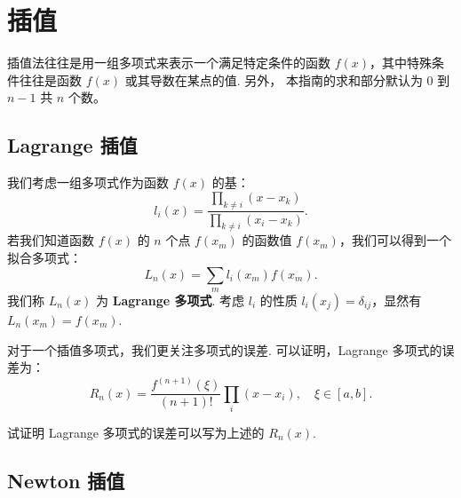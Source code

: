 \chapter{插值}
插值法往往是用一组多项式来表示一个满足特定条件的函数 $f(x)$，其中特殊条件往往是函数 $f(x)$ 或其导数在某点的值. 另外，{\color{red} 本指南的求和部分默认为 $0$ 到 $n-1$ 共 $n$ 个数。}

\section{Lagrange 插值}
我们考虑一组多项式作为函数 $f(x)$ 的基：
\[
    l_i(x) = \dfrac{\prod_{k\neq i}(x-x_k)}{\prod_{k\neq i}(x_i-x_k)}.
\]
若我们知道函数 $f(x)$ 的 $n$ 个点 $f(x_m)$ 的函数值 $f(x_m)$，我们可以得到一个拟合多项式：
\[
    L_n(x) = \sum_{m} l_i(x_m)f(x_m).
\]
我们称 $L_n(x)$ 为 {\bf Lagrange 多项式}. 考虑 $l_i$ 的性质 $l_i(x_j) = \delta_{ij}$，显然有 $L_n(x_m) = f(x_m)$.

对于一个插值多项式，我们更关注多项式的误差. 可以证明，Lagrange 多项式的误差为：
\[
    R_n(x) = \dfrac{f^{(n+1)}(\xi)}{(n+1)!}\prod_i( x-x_i),\quad \xi \in [a,b].
\]
\begin{problembox}
    \begin{example}
        试证明 Lagrange 多项式的误差可以写为上述的 $R_n(x)$.
    \end{example}
\end{problembox}

\section{Newton 插值}

